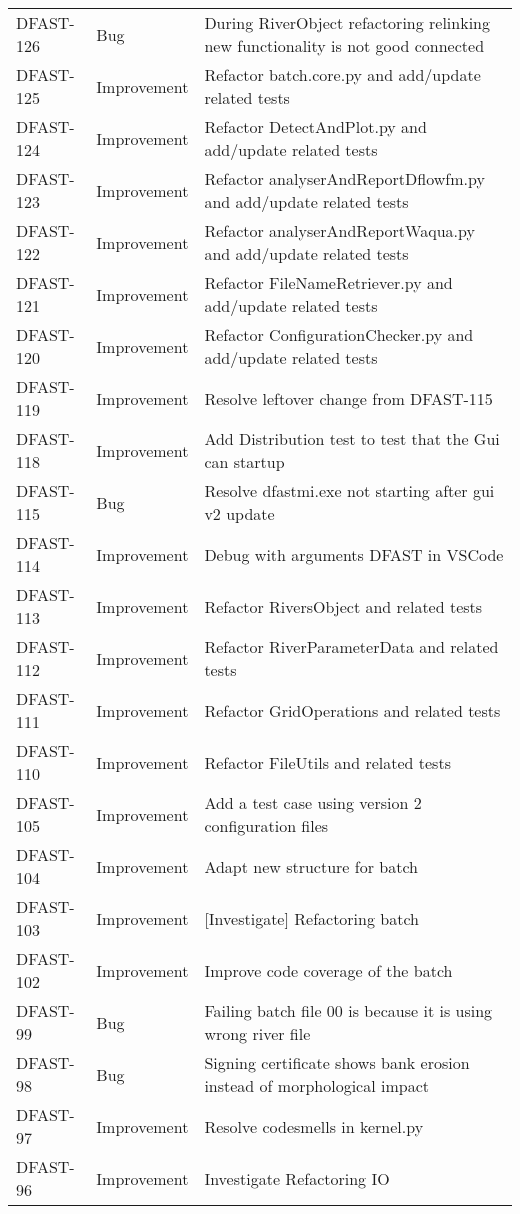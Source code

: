 \documentclass[git]{deltares_manual}
\begin{document}
\begin{longtable}{l|l|p{8cm}}
DFAST-126 & Bug & During RiverObject refactoring relinking new functionality is not good connected \\
DFAST-125 & Improvement & Refactor batch.core.py and add/update related tests \\
DFAST-124 & Improvement & Refactor DetectAndPlot.py and add/update related tests \\
DFAST-123 & Improvement & Refactor analyserAndReportDflowfm.py and add/update related tests \\
DFAST-122 & Improvement & Refactor analyserAndReportWaqua.py and add/update related tests \\
DFAST-121 & Improvement & Refactor FileNameRetriever.py and add/update related tests \\
DFAST-120 & Improvement & Refactor ConfigurationChecker.py and add/update related tests \\
DFAST-119 & Improvement & Resolve leftover change from DFAST-115 \\
DFAST-118 & Improvement & Add Distribution test to test that the Gui can startup \\
DFAST-115 & Bug & Resolve dfastmi.exe not starting after gui v2 update \\
DFAST-114 & Improvement & Debug with arguments DFAST in VSCode \\
DFAST-113 & Improvement & Refactor RiversObject and related tests \\
DFAST-112 & Improvement & Refactor RiverParameterData and related tests \\
DFAST-111 & Improvement & Refactor GridOperations and related tests \\
DFAST-110 & Improvement & Refactor FileUtils and related tests \\
DFAST-105 & Improvement & Add a test case using version 2 configuration files \\
DFAST-104 & Improvement & Adapt new structure for batch \\
DFAST-103 & Improvement & [Investigate] Refactoring batch \\
DFAST-102 & Improvement & Improve code coverage of the batch \\
DFAST-99 & Bug & Failing batch file 00 is because it is using wrong river file \\
DFAST-98 & Bug & Signing certificate shows bank erosion instead of morphological impact \\
DFAST-97 & Improvement & Resolve codesmells in kernel.py \\
DFAST-96 & Improvement & Investigate Refactoring IO \\

\end{longtable}
\end{document}
